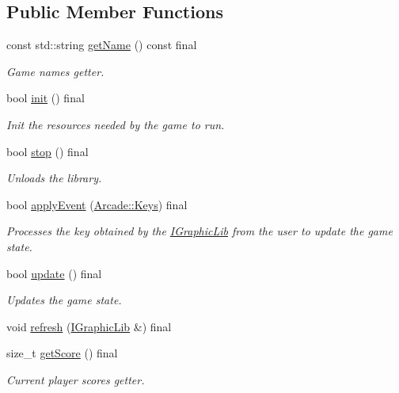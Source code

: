\subsection*{Public Member Functions}
\begin{DoxyCompactItemize}
\item 
const std\+::string \hyperlink{class_arcade_1_1_pacman_abc48d59a534276889f45128fe877d5d9}{get\+Name} () const final
\begin{DoxyCompactList}\small\item\em Game name\textquotesingle{}s getter. \end{DoxyCompactList}\item 
bool \hyperlink{class_arcade_1_1_pacman_a27b0ecc843707c735ed1b65e7da009e1}{init} () final
\begin{DoxyCompactList}\small\item\em Init the resources needed by the game to run. \end{DoxyCompactList}\item 
bool \hyperlink{class_arcade_1_1_pacman_a2787800feab139ddeabb11d6ee23a80e}{stop} () final
\begin{DoxyCompactList}\small\item\em Unloads the library. \end{DoxyCompactList}\item 
bool \hyperlink{class_arcade_1_1_pacman_ac5fa3a4d5eaa81d37e8b63451265870d}{apply\+Event} (\hyperlink{namespace_arcade_a9b501908b20bc993e4f8226db5323c41}{Arcade\+::\+Keys}) final
\begin{DoxyCompactList}\small\item\em Processes the key obtained by the \hyperlink{class_arcade_1_1_i_graphic_lib}{I\+Graphic\+Lib} from the user to update the game state. \end{DoxyCompactList}\item 
bool \hyperlink{class_arcade_1_1_pacman_aacb11530e954870a6939d91794cbe356}{update} () final
\begin{DoxyCompactList}\small\item\em Updates the game state. \end{DoxyCompactList}\item 
void \hyperlink{class_arcade_1_1_pacman_ad0d57afab410c98d4050c030b06ad63a}{refresh} (\hyperlink{class_arcade_1_1_i_graphic_lib}{I\+Graphic\+Lib} \&) final
\item 
size\+\_\+t \hyperlink{class_arcade_1_1_pacman_a7683729dd33fb18673c4d77764ca1831}{get\+Score} () final
\begin{DoxyCompactList}\small\item\em Current player score\textquotesingle{}s getter. \end{DoxyCompactList}\end{DoxyCompactItemize}


